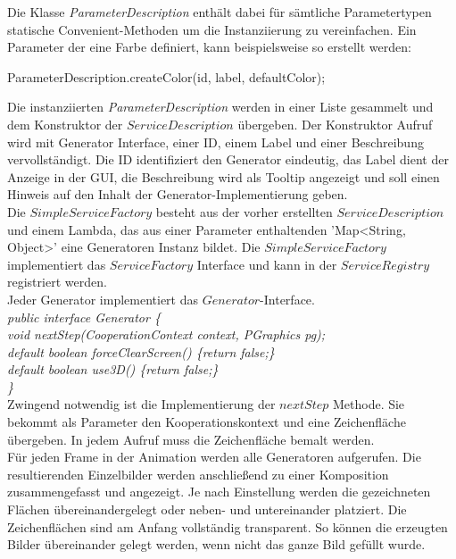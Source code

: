 \documentclass[../mciAusarbeitung.tex]{subfiles}
\begin{document}
Die Klasse \textit{ParameterDescription} enthält dabei für sämtliche Parametertypen statische Convenient-Methoden um die Instanziierung zu vereinfachen. 
Ein Parameter der eine Farbe definiert, kann beispielsweise so erstellt werden:
\newline
\begin{itshape}
\indent ParameterDescription.createColor(id, label, defaultColor);
\end{itshape}\newline
Die instanziierten \textit{ParameterDescription} werden in einer Liste gesammelt und dem Konstruktor der $ServiceDescription$ übergeben. Der Konstruktor Aufruf wird mit Generator Interface, einer ID, einem Label und einer Beschreibung vervollständigt. Die ID identifiziert den Generator eindeutig, das Label dient der Anzeige in der GUI, die Beschreibung wird als Tooltip angezeigt und soll einen Hinweis auf den Inhalt der Generator-Implementierung geben. \\
Die $SimpleServiceFactory$ besteht aus der vorher erstellten $ServiceDescription$ und einem Lambda, das aus einer Parameter enthaltenden 'Map<String, Object>' eine Generatoren Instanz bildet. Die $SimpleServiceFactory$ implementiert das $ServiceFactory$ Interface und kann in der $ServiceRegistry$ registriert werden.\\
Jeder Generator implementiert das $Generator$-Interface. \\
\textit{
\indent public interface Generator \{\\
\indent	\indent void nextStep(CooperationContext context, PGraphics pg);\\
\indent	\indent default boolean forceClearScreen() \{return false;\}\\
\indent	\indent default boolean use3D() \{return false;\}\\
\indent \}\\
}
Zwingend notwendig ist die Implementierung der $nextStep$ Methode. Sie bekommt als Parameter den Kooperationskontext und eine Zeichenfläche übergeben. In jedem Aufruf muss die Zeichenfläche bemalt werden. \\
Für jeden Frame in der Animation werden alle Generatoren aufgerufen. Die resultierenden Einzelbilder werden anschließend zu einer Komposition zusammengefasst und angezeigt. Je nach Einstellung werden die gezeichneten Flächen übereinandergelegt oder neben- und untereinander platziert.
Die Zeichenflächen sind am Anfang vollständig transparent. So können die erzeugten Bilder übereinander gelegt werden, wenn nicht das ganze Bild gefüllt wurde.
\end{document}
